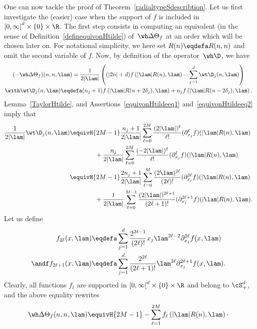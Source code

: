 One can now tackle the proof of Theorem~\ref{radialtypeSdescribtion}. Let us first investigate the (easier) case when the support of $f$ is included in~$[0,\infty\mathclose{[}^d\times\{0\}\times \R$. The first step consists in computing an equivalent (in the sense of Definition~\ref{definequivonHtilde}) of~$\wh\Delta\Theta_f$ at an order which will be chosen later on. For notational simplicity, we here set $R(n)\eqdefa R(n,n)$ and omit the second variable of $f$. Now, by definition of the operator~$\wh \D$, we have
\begin{multline}\label{radialSdescribtiondemoeq0}
(-\wh \Delta \Theta_f)(n,n,\lam) = \frac 1 {2 |\lam|} \left((|2n| +d) f\left (|\lam|R(n),\lam\right) -\sum_{j=1}^d \wt \D_j (n,\lam)\right)\\ \with \wt \D_j (n,\lam) \eqdefa (n_j+1)f \left(|\lam|R(n+2\delta_j),\lam\right) +n_j f \left(|\lam|R(n-2\delta_j),\lam\right).
\end{multline}
Lemma~\ref{TaylorHtilde}, and Assertions~\eqref{equivonHtildeeq1} and~\eqref{equivonHtildeeq2} imply that
\[
\begin{aligned}
\frac 1 {2|\lam|} \wt \D_j (n,\lam) &\equivH {2M-1} \frac {n_j+1} {2|\lam|}
\sum_{\ell=0} ^{2M} \frac {(2|\lam|)^\ell } {\ell!} (\partial_{x_j}^\ell f)(|\lam|R(n),\lam)\\
&\qquad\qquad {}+\frac {n_j} {2|\lam|} \sum_{\ell=0} ^{2M} \frac { (-2|\lam|)^\ell } {\ell!} (\partial_{x_j}^\ell f)(|\lam|R(n),\lam)\\
&\equivH {2M-1} \frac {2n_j+1} {2|\lam|} \sum_{\ell=0} ^{M} \frac {(2\lam)^{2\ell}} {(2\ell)!} (\partial_{x_j}^{2\ell} f)(|\lam|R(n),\lam)\\
&\qquad\qquad {}+\frac {1} {2|\lam|}
\sum_{\ell=0} ^{M-1} \frac {(2|\lam|)^{2\ell+1} } {(2\ell+1)!} (\partial_{x_j}^{2\ell+1} f)(|\lam|R(n),\lam).
\end{aligned}
\]
Let us define
\[
\begin{aligned}
f_{2\ell} (x,\lam) &\eqdefa \sum_{j=1}^d \frac {2^{2\ell-1}} {(2\ell)!} x_j\lam^{2\ell-2} \partial_{x_j}^{2\ell} f(x, \lam)\\ \andf
f_{2\ell+1} (x,\lam) &\eqdefa \sum_{j=1}^d \frac {2^{2\ell}} {(2\ell+1)!} \lam^{2\ell} \partial^{2\ell+1}_{x_j} f(x, \lam).
\end{aligned}
\]
Clearly, all functions $f_\ell$ are supported in $[0,\infty\mathclose{[}^d\times\{0\}\times\R$ and belong to $\cS^d_+$, and the above equality rewrites
\begin{equation}\label{radialSdescribtiondemoeq2}
\wh \Delta \Theta_f (n,n,\lam) \equivH {2M-1} - \sum_{\ell=1}^{2M} f_\ell \left(|\lam|R(n),\lam\right)\cdotp
\end{equation}

